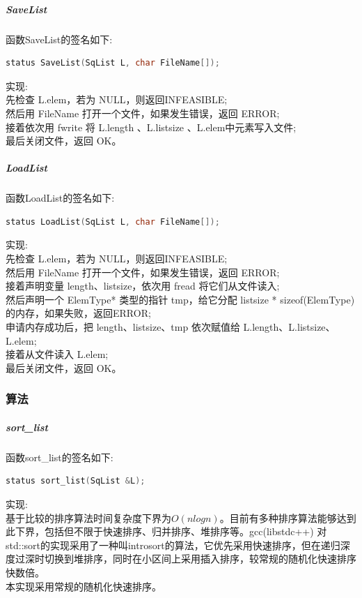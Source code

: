 \documentclass[supercite]{Experimental_Report}
\theoremstyle{definition}
\begin{document}
\subparagraph{SaveList}
\noindent
函数SaveList的签名如下:
\begin{lstlisting}[language=C++, frame=single]
status SaveList(SqList L, char FileName[]);
\end{lstlisting}

\noindent
实现: \\
先检查 L.elem，若为 NULL，则返回INFEASIBLE; \\
然后用 FileName 打开一个文件，如果发生错误，返回 ERROR; \\
接着依次用 fwrite 将 L.length 、L.listsize 、L.elem中元素写入文件; \\
最后关闭文件，返回 OK。\\

\subparagraph{LoadList}
\noindent
函数LoadList的签名如下:
\begin{lstlisting}[language=C++, frame=single]
status LoadList(SqList L, char FileName[]);
\end{lstlisting}

\noindent
实现: \\
先检查 L.elem，若为 NULL，则返回INFEASIBLE; \\
然后用 FileName 打开一个文件，如果发生错误，返回 ERROR; \\
接着声明变量 length、listsize，依次用 fread 将它们从文件读入; \\
然后声明一个 ElemType* 类型的指针 tmp，给它分配 listsize * sizeof(ElemType) 的内存，如果失败，返回ERROR; \\
申请内存成功后，把 length、listsize、tmp 依次赋值给 L.length、L.listsize、L.elem; \\
接着从文件读入 L.elem; \\
最后关闭文件，返回 OK。\\

\newpage

\subsubsection{算法}

\subparagraph{sort\_list}
\noindent
函数sort\_list的签名如下:
\begin{lstlisting}[language=C++, frame=single]
status sort_list(SqList &L);
\end{lstlisting}

\noindent
实现: \\
基于比较的排序算法时间复杂度下界为$O(nlogn)$。目前有多种排序算法能够达到此下界，包括但不限于快速排序、归并排序、堆排序等。gcc(libstdc++) 对std::sort的实现采用了一种叫introsort的算法，它优先采用快速排序，但在递归深度过深时切换到堆排序，同时在小区间上采用插入排序，较常规的随机化快速排序快数倍。\\
本实现采用常规的随机化快速排序。\\
\end{document}
